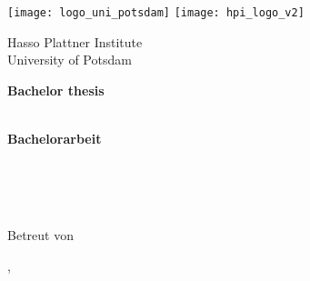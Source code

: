 \begin{titlepage}

\centering

\texttt{[image: logo\_uni\_potsdam]}
\hspace{2.5cm}
\texttt{[image: hpi\_logo\_v2]}
\vspace*{0.75cm}

\Large 
Hasso Plattner Institute\\
University of Potsdam

\vspace{2cm}

\Large
\textbf{Bachelor thesis}\\[0.5\baselineskip]
\LARGE
\textbf{\docTitle}\\[0.5\baselineskip]

\vspace{2cm}

\Large
\textbf{Bachelorarbeit}\\[0.5\baselineskip]
\LARGE
\textbf{\docTitleDE}\\[0.5\baselineskip]

\vspace{2cm}

\Large
\docAuthor\\[0.5\baselineskip]
{\normalsize \docAuthorMail}\\

\vfill

\large
Betreut von \docSupervisited
\\[1.0\baselineskip]
\docChair

\vspace{1cm}
\textsf{\docCity{}, \docDate}\\ %
\end{titlepage}
